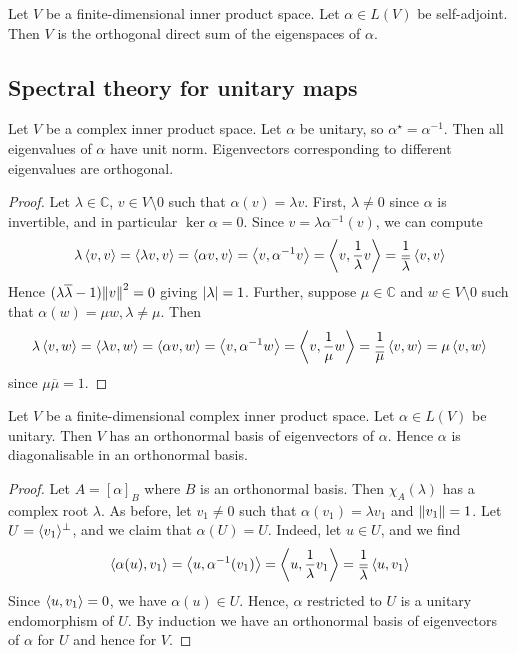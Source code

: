 \begin{corollary}
	Let \( V \) be a finite-dimensional inner product space.
	Let \( \alpha \in L(V) \) be self-adjoint.
	Then \( V \) is the orthogonal direct sum of the eigenspaces of \( \alpha \).
\end{corollary}

\subsection{Spectral theory for unitary maps}
\begin{lemma}
	Let \( V \) be a complex inner product space.
	Let \( \alpha \) be unitary, so \( \alpha^\star = \alpha^{-1} \).
	Then all eigenvalues of \( \alpha \) have unit norm.
	Eigenvectors corresponding to different eigenvalues are orthogonal.
\end{lemma}
\begin{proof}
	Let \( \lambda \in \mathbb C \), \( v \in V \setminus \qty{0} \) such that \( \alpha(v) = \lambda v \).
	First, \( \lambda \neq 0 \) since \( \alpha \) is invertible, and in particular \( \ker \alpha = \qty{0} \).
	Since \( v = \lambda \alpha^{-1}(v) \), we can compute
	\[
		\lambda \left\langle{v,v}\right\rangle = \left\langle{\lambda v, v}\right\rangle = \left\langle{\alpha v, v}\right\rangle = \left\langle{v, \alpha^{-1} v}\right\rangle = \left\langle{v, \frac{1}{\lambda} v}\right\rangle = \frac{1}{\overline \lambda} \left\langle{v, v}\right\rangle
	\]
	Hence \( (\lambda \overline \lambda - 1) \norm{v}^2 = 0 \) giving \( \abs{\lambda} = 1 \).
	Further, suppose \( \mu \in \mathbb C \) and \( w \in V \setminus \qty{0} \) such that \( \alpha(w) = \mu w, \lambda \neq \mu \).
	Then
	\[
		\lambda \left\langle{v,w}\right\rangle = \left\langle{\lambda v, w}\right\rangle = \left\langle{\alpha v, w}\right\rangle = \left\langle{v, \alpha^{-1} w}\right\rangle = \left\langle{v, \frac{1}{\mu} w}\right\rangle = \frac{1}{\overline \mu} \left\langle{v,w}\right\rangle = \mu \left\langle{v,w}\right\rangle
	\]
	since \( \mu \overline \mu = 1 \).
\end{proof}
\begin{theorem}
	Let \( V \) be a finite-dimensional complex inner product space.
	Let \( \alpha \in L(V) \) be unitary.
	Then \( V \) has an orthonormal basis of eigenvectors of \( \alpha \).
	Hence \( \alpha \) is diagonalisable in an orthonormal basis.
\end{theorem}
\begin{proof}
	Let \( A = [\alpha]_B \) where \( B \) is an orthonormal basis.
	Then \( \chi_A(\lambda) \) has a complex root \( \lambda \).
	As before, let \( v_1 \neq 0 \) such that \( \alpha(v_1) = \lambda v_1 \) and \( \norm{v_1} = 1 \).
	Let \( U = \langle{} v_1 \rangle^\perp \), and we claim that \( \alpha(U) = U \).
	Indeed, let \( u \in U \), and we find
	\[
		\left\langle{\alpha(u), v_1}\right\rangle = \left\langle{u, \alpha^{-1}(v_1)}\right\rangle = \left\langle{u, \frac{1}{\lambda} v_1}\right\rangle = \frac{1}{\overline \lambda} \left\langle{u,v_1}\right\rangle
	\]
	Since \( \left\langle{u, v_1}\right\rangle = 0 \), we have \( \alpha(u) \in U \).
	Hence, \( \alpha \) restricted to \( U \) is a unitary endomorphism of \( U \).
	By induction we have an orthonormal basis of eigenvectors of \( \alpha \) for \( U \) and hence for \( V \).
\end{proof}
